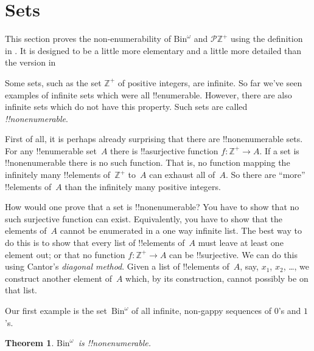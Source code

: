 \documentclass[10pt,a4paper]{article}
\makeatletter
\theoremstyle{plain}
\newtheorem{thm}{Theorem}[section]
\theoremstyle{definition}
\theoremstyle{remark}
\newenvironment{editorial}{}{}
\newcommand*{\olfileid}[3]{}
\newcommand*{\olsection}[1]{\section*{#1}}
\newcommand*{\ollabel}[1]{\label{#1}}
\newcommand{\olref}{\@ifnextchar[{\olref@i}{\olref@final}}
\def\olref@i[#1]{\@ifnextchar[{\olref@ii}{\olref@final}}
\def\olref@ii[#1]{\@ifnextchar[{\olref@iii}{\olref@final}}
\def\olref@iii[#1]{\olref@final}
\def\olref@final#1{\ref{#1}}
\providecommand{\PosInt}{\mathbb{Z}^{+}}
\providecommand{\Bin}{\mathrm{Bin}}
\providecommand{\Pow}{\mathcal{P}}
\makeatother
\begin{document}
\olfileid{sfr}{siz}{nen}

\olsection{ Sets}

\begin{editorial}
  This section proves the non-enumerability of $\Bin^\omega$ and
  $\Pow{\PosInt}$ using the definition in \olref[enm]{sec}. It is
  designed to be a little more elementary and a little more detailed
  than the version in \olref[enm-alt]{sec}
\end{editorial}

Some sets, such as the set $\PosInt$ of positive integers, are
infinite. So far we've seen examples of infinite sets which were all
!!{enumerable}. However, there are also infinite sets which do not
have this property. Such sets are called \emph{!!{nonenumerable}}.

First of all, it is perhaps already surprising that there are
!!{nonenumerable} sets.  For any !!{enumerable} set~$A$ there is
!!a{surjective} function $f \colon \PosInt \to A$.  If a set is
!!{nonenumerable} there is no such function.  That is, no function
mapping the infinitely many !!{element}s of~$\PosInt$ to~$A$ can
exhaust all of~$A$.  So there are ``more'' !!{element}s of~$A$ than
the infinitely many positive integers.

How would one prove that a set is !!{nonenumerable}? You have to show
that no such surjective function can exist. Equivalently, you have to
show that the elements of~$A$ cannot be enumerated in a one way
infinite list.  The best way to do this is to show that every list of
!!{element}s of~$A$ must leave at least one element out; or that no
function $f\colon \PosInt \to A$ can be !!{surjective}.  We can do this
using Cantor's \emph{diagonal method}.  Given a list of !!{element}s
of~$A$, say, $x_1$, $x_2$, \dots, we construct another element of~$A$
which, by its construction, cannot possibly be on that list.

Our first example is the set~$\Bin^\omega$ of all infinite, non-gappy
sequences of $0$'s and $1$'s.

\begin{thm}
\ollabel{thm:nonenum-bin-omega}
$\Bin^\omega$~is !!{nonenumerable}.
\end{thm}
\end{document}

